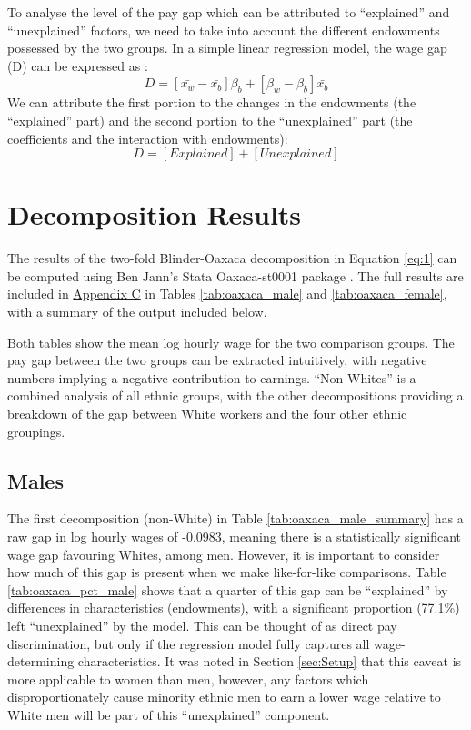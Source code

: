 \documentclass[class=article, crop=false]{standalone}
\begin{document}
To analyse the level of the pay gap which can be attributed to \enquote{explained} and \enquote{unexplained} factors, we need to take into account the different endowments possessed by the two groups. In a simple linear regression model, the wage gap (D) can be expressed as \citep{WB}:
\begin{equation}
  D = [\bar{x_{w}} - \bar{x_{b}}]\beta_{b} + [\beta_{w} - \beta_{b}]\bar{x_{b}}
  \label{eq:1}
\end{equation}
We can attribute the first portion to the changes in the endowments (the \enquote{explained} part) and the second portion to the \enquote{unexplained} part (the coefficients and the interaction with endowments):
\begin{equation}
  D = [Explained] + [Unexplained]
  \label{eq:2}
\end{equation}

\section{Decomposition Results}
\label{sec:Decomposition Results}
The results of the two-fold Blinder-Oaxaca decomposition in Equation \ref{eq:1} can be computed using Ben Jann's Stata Oaxaca-st0001 package \citep{Jann}. The full results are included in \hyperref[sec:appendixC]{Appendix C} in Tables \ref{tab:oaxaca_male} and \ref{tab:oaxaca_female}, with a summary of the output included below.

Both tables show the mean log hourly wage for the two comparison groups. The pay gap between the two groups can be extracted intuitively, with negative numbers implying a negative contribution to earnings. \enquote{Non-Whites} is a combined analysis of all ethnic groups, with the other decompositions providing a breakdown of the gap between White workers and the four other ethnic groupings.

\subsection{Males}
\label{sec:Males} %
The first decomposition (non-White) in Table \ref{tab:oaxaca_male_summary} has a raw gap in log hourly wages of -0.0983, meaning there is a statistically significant wage gap favouring Whites, among men. However, it is important to consider how much of this gap is present when we make like-for-like comparisons. Table \ref{tab:oaxaca_pct_male} shows that a quarter of this gap can be \enquote{explained} by differences in characteristics (endowments), with a significant proportion (77.1\%) left \enquote{unexplained} by the model. This can be thought of as direct pay discrimination, but only if the regression model fully captures all wage-determining characteristics. It was noted in Section \ref{sec:Setup} that this caveat is more applicable to women than men, however, any factors which disproportionately cause minority ethnic men to earn a lower wage relative to White men will be part of this \enquote{unexplained} component.
\end{document}
